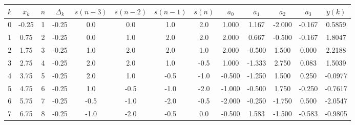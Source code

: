 \documentclass[border=3mm]{standalone}
\begin{document}
\begin{tabular}{
		*{1}{S[table-format = 2.0]}
		*{1}{S[table-format = 2.2]}
		*{1}{S[table-format = 2.0]}
		*{1}{S[table-format = 2.2]}
		*{1}{S[table-format = 3.1]}
		*{1}{S[table-format = 3.1]}
		*{1}{S[table-format = 3.1]}
		*{1}{S[table-format = 3.1]}
		*{1}{S[table-format = 3.3]}
		*{1}{S[table-format = 3.3]}
		*{1}{S[table-format = 3.3]}
		*{1}{S[table-format = 3.3]}
		*{1}{S[table-format = 1.4]}
	}
	
\toprule
{$k$} & {$x_k$}  &   {$n$}  &   {$\Delta_k$}  & {$s(n-3)$} &  {$s(n-2)$} &  {$s(n-1)$} &  {$s(n)$} & {$a_0$}  &  {$a_1$} & {$a_2$} & {$a_3$} & {$y(k)$}\\  
 & -0.25 &  1 &  -0.25  &   0.0   &  0.0  &  1.0 &   2.0 &   1.000 &   1.167 & -2.000 & -0.167 &   0.5859 \\
  1 &  0.75 &  2 &  -0.25  &   0.0   &  1.0  &  2.0 &   2.0 &   2.000 &   0.667 & -0.500 & -0.167 &   1.8047 \\
  2 &  1.75 &  3 &  -0.25  &   1.0   &  2.0  &  2.0 &   1.0 &   2.000 &  -0.500 &  1.500 &  0.000 &   2.2188 \\
  3 &  2.75 &  4 &  -0.25  &   2.0   &  2.0  &  1.0 &  -0.5 &   1.000 &  -1.333 &  2.750 &  0.083 &   1.5039 \\
  4 &  3.75 &  5 &  -0.25  &   2.0   &  1.0  & -0.5 &  -1.0 &  -0.500 &  -1.250 &  1.500 &  0.250 &  -0.0977 \\
  5 &  4.75 &  6 &  -0.25  &   1.0   & -0.5  & -1.0 &  -2.0 &  -1.000 &  -0.500 &  1.750 & -0.250 &  -0.7617 \\
  6 &  5.75 &  7 &  -0.25  &  -0.5   & -1.0  & -2.0 &  -0.5 &  -2.000 &  -0.250 & -1.750 &  0.500 &  -2.0547 \\
  7 &  6.75 &  8 &  -0.25  &  -1.0   & -2.0  & -0.5 &   0.0 &  -0.500 &   1.583 & -1.500 & -0.583 &  -0.9805 \\
\bottomrule

\end{tabular}
\end{document}
